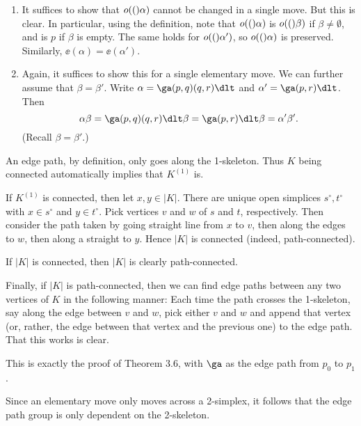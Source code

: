 \documentclass[../../solutions.tex]{subfiles}
\begin{document}
\begin{exercise} \leavevmode
\begin{enumerate}
\item
It suffices to show that $o(()\alpha)$ cannot be changed in a single move.
But this is clear.
In particular, using the definition, note that $o(()\alpha)$ is $o(()\beta)$ if $\beta\ne\emptyset$, and is $p$ if $\beta$ is empty.
The same holds for $o(()\alpha')$, so $o(()\alpha)$ is preserved.
Similarly, $\ee(\alpha)=\ee(\alpha')$.

\item
Again, it suffices to show this for a single elementary move.
We can further assume that $\beta=\beta'$.
Write $\alpha=\ga(p,q)(q,r)\dlt$ and $\alpha'=\ga(p,r)\dlt$.
Then
\[\alpha\beta=\ga(p,q)(q,r)\dlt\beta=\ga(p,r)\dlt\beta=\alpha'\beta'.\]
(Recall $\beta=\beta'$.)
\end{enumerate}
\end{exercise}

\begin{exercise} \leavevmode
An edge path, by definition, only goes along the 1-skeleton.
Thus $K$ being connected automatically implies that $K^{(1)}$ is.

If $K^{(1)}$ is connected, then let $x,y\in|K|$.
There are unique open simplices $s^\circ,t^\circ$ with $x\in s^\circ$ and $y\in t^\circ$.
Pick vertices $v$ and $w$ of $s$ and $t$, respectively.
Then consider the path taken by going straight line from $x$ to $v$, then along the edges to $w$, then along a straight to $y$.
Hence $|K|$ is connected (indeed, path-connected).

If $|K|$ is connected, then $|K|$ is clearly path-connected.

Finally, if $|K|$ is path-connected, then we can find edge paths between any two vertices of $K$ in the following manner:
Each time the path crosses the 1-skeleton, say along the edge between $v$ and $w$, pick either $v$ and $w$ and append that vertex (or, rather, the edge between that vertex and the previous one) to the edge path.
That this works is clear.
\end{exercise}

\begin{exercise} \leavevmode
This is exactly the proof of Theorem 3.6, with $\ga$ as the edge path from $p_0$ to $p_1$.
\end{exercise}

\begin{exercise} \leavevmode
Since an elementary move only moves across a 2-simplex, it follows that the edge path group is only dependent on the 2-skeleton.
\end{exercise}
\end{document}
